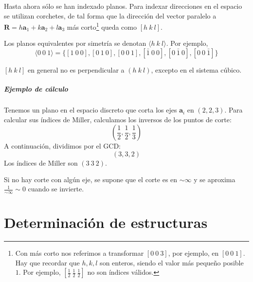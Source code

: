 Hasta ahora sólo se han indexado planos. Para indexar direcciones en
el espacio se utilizan corchetes, de tal forma que la dirección del vector paralelo a
$\mathbf{R} = h \mathbf{a}_1 + k\mathbf{a}_2 + l \mathbf{a}_3$ más corto\footnote{Con más corto nos referimos a transformar $[0\ 0\ 3]$, por ejemplo, en $[0\ 0\ 1]$. Hay que recordar que $h,k,l$ son enteros, siendo el valor más pequeño posible $1$. Por ejemplo, $[\frac{1}{2}\ \frac{1}{2}\ \frac{1}{2}]$ no son índices válidos.} queda
como $[h\ k\ l]$. 

Los planos equivalentes por simetría se denotan $\langle h\ k\ l\rangle$. Por ejemplo,
\begin{equation*}
  \langle 0 \ 0 \ 1\rangle = \{ [1\  0\  0], [0\  1\  0], [0\  0\  1], [\bar 1\  0\  0], [0\  \bar 1\  0], [0\  0\  \bar 1]\}
\end{equation*}

$[h\ k\ l]$ en general no es perpendicular a $(h \ k\ l)$, excepto en el sistema cúbico.

\paragraph{Ejemplo de cálculo}
Tenemos un plano en el espacio discreto que corta los ejes
$\mathbf{a}_i$ en $(2,2,3)$. Para calcular sus índices de Miller,
calculamos los inversos de los puntos de corte:
\begin{equation*}
 \left(\frac{1}{2},\frac{1}{2},\frac{1}{3}\right)
\end{equation*}
A continuación, dividimos por el GCD:
\begin{equation*}
 (3,3,2)
\end{equation*}
Los índices de Miller son $(3\ 3\ 2)$.

Si no hay corte con algún eje, se supone que el corte es en
$\sim \infty$ y se aproxima $\frac{1}{\sim \infty} \sim 0$ cuando se
invierte.

\chapter{Determinación de estructuras}

